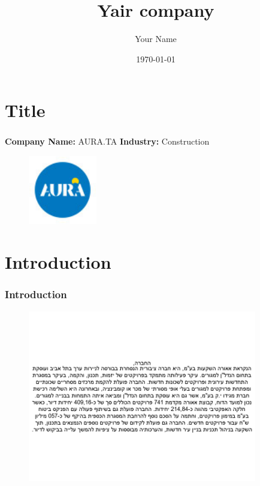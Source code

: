 \documentclass{beamer}%
\title{Yair company}%
\author{Your Name}%
\date{\today}%
\begin{document}
%
\normalsize%
\section{Title}%
\label{sec:Title}%
\begin{frame}%
\frametitle{}%
\textbf{Company Name: }%
AURA.TA%
\textbf{ Industry: }%
Construction%


\begin{figure}[h!]%
\centering%
\includegraphics[width=30mm]{company_logo.jpg}%
\end{figure}

%
\end{frame}

%
\section{Introduction}%
\label{sec:Introduction}%
\begin{frame}%
\frametitle{Introduction}%


\begin{figure}[h!]%
\centering%
\includegraphics[width=100mm]{intro.png}%
\end{figure}

%
\end{frame}

%
\end{document}
